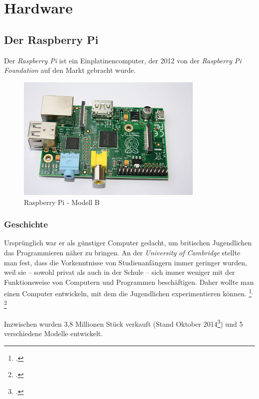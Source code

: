 \chapter{Hardware}
\label{cha:Hardware}

\section{Der Raspberry Pi}
\label{sec:Raspberry}
Der \emph{Raspberry Pi} ist ein Einplatinencomputer, der 2012 von der \emph{Raspberry Pi Foundation} auf den Markt gebracht wurde.

\begin{figure}[h]
  \centering
     \includegraphics[width=0.8\textwidth]{figures/raspberry.jpg}
 \caption[Raspberry Pi - Modell B]{Raspberry Pi - Modell B\footnotemark}
  \label{fig:raspberry}
\end{figure}

\subsection{Geschichte}
\label{subsec:Geschichte}
Ursprünglich war er als günstiger Computer gedacht, um britischen Jugendlichen das Programmieren näher zu bringen. An der \emph{University of Cambridge} stellte man fest, dass die Vorkenntnisse von Studienanfängern immer geringer wurden, weil sie -- sowohl privat als auch in der Schule -- sich immer weniger mit der Funktionsweise von Computern und Programmen beschäftigen. Daher wollte man einen Computer entwickeln, mit dem die Jugendlichen experimentieren können.
\footcite{aboutraspberry}$^,$
\footcite[Geschichte]{wiki:raspberry}

Inzwischen wurden 3,8 Millionen Stück verkauft (Stand Oktober 2014\footcite{verkauf}) und 5 verschiedene Modelle entwickelt.

